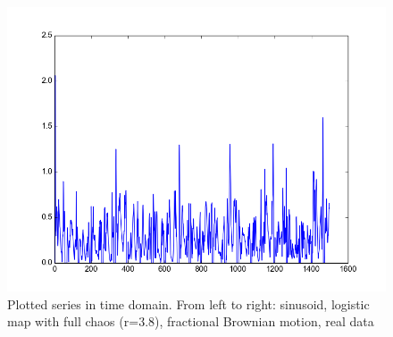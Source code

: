 \documentclass[12pt]{article}
\begin{document}
\begin{figure}
\begin{center}
    \includegraphics[scale=0.4]{plot_vr}
  \end{center}
  \caption{Plotted series in time domain. From left to right: sinusoid, logistic map with full chaos (r=3.8), fractional Brownian motion, real data}
\end{figure}
\end{document}
